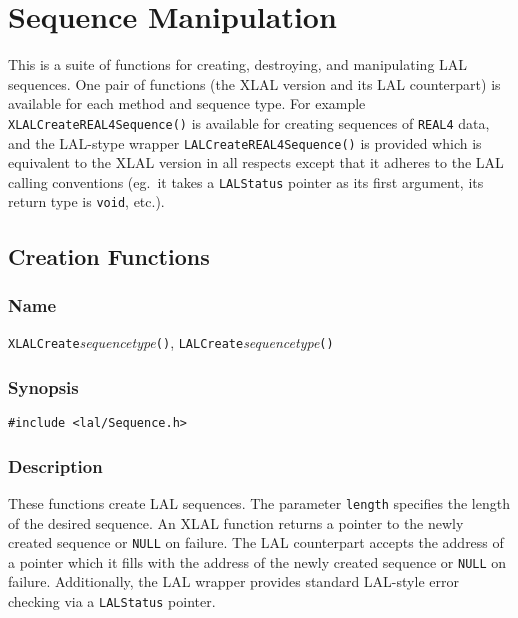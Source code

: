 \clearpage
\section{Sequence Manipulation}
\label{s:SequenceManipulation}

This is a suite of functions for creating, destroying, and manipulating LAL
sequences.  One pair of functions (the XLAL version and its LAL
counterpart) is available for each method and sequence type.  For example
\texttt{XLALCreateREAL4Sequence()} is available for creating sequences of
\texttt{REAL4} data, and the LAL-stype wrapper
\texttt{LALCreateREAL4Sequence()} is provided which is equivalent to the
XLAL version in all respects except that it adheres to the LAL calling
conventions (eg.\ it takes a \texttt{LALStatus} pointer as its first
argument, its return type is \texttt{void}, etc.).

\subsection{Creation Functions}

\subsubsection{Name}

\texttt{XLALCreate}\textit{sequencetype}\texttt{()},
\texttt{LALCreate}\textit{sequencetype}\texttt{()}

\subsubsection{Synopsis}

\begin{verbatim}
#include <lal/Sequence.h>
\end{verbatim}


\subsubsection{Description}

These functions create LAL sequences.  The parameter \texttt{length}
specifies the length of the desired sequence.  An XLAL function returns a
pointer to the newly created sequence or \texttt{NULL} on failure.  The LAL
counterpart accepts the address of a pointer which it fills with the
address of the newly created sequence or \texttt{NULL} on failure.
Additionally, the LAL wrapper provides standard LAL-style error checking
via a \texttt{LALStatus} pointer.

